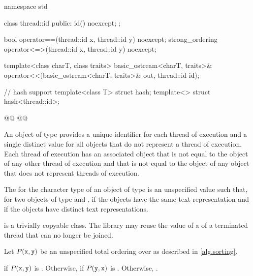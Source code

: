 \documentclass{wg21}
\begin{document}
%
%
\begin{codeblock}
    namespace std {
        class thread::id {
            public:
            id() noexcept;
        };

        bool operator==(thread::id x, thread::id y) noexcept;
        strong_ordering operator<=>(thread::id x, thread::id y) noexcept;

        template<class charT, class traits>
        basic_ostream<charT, traits>&
        operator<<(basic_ostream<charT, traits>& out, thread::id id);

        // hash support
        template<class T> struct hash;
        template<> struct hash<thread::id>;

        @@
        @@
    }
\end{codeblock}

\pnum
An object of type  provides a unique identifier for
each thread of execution and a single distinct value for all 
objects that do not represent a thread of
execution. Each thread of execution has an
associated  object that is not equal to the
 object of any other thread of execution and that is not
equal to the  object of any  object that
does not represent threads of execution.

\begin{addedblock}
The  for the character type  of an object of type 
is an unspecified value such that, for two objects of type   and ,
if  the  objects have the same text
representation and if  the  objects have
distinct text representations.
\end{addedblock}

\pnum
{} is a trivially copyable class.
The library may reuse the value of a  of a terminated thread that can no longer be joined.


\begin{itemdescr}
    \pnum
    Let $P(\texttt{x}, \texttt{y})$ be
    an unspecified total ordering over 
    as described in \ref{alg.sorting}.

    \pnum
    \returns
     if $P(\texttt{x}, \texttt{y})$ is .
    Otherwise, 
    if $P(\texttt{y}, \texttt{x})$ is .
    Otherwise, .
\end{itemdescr}
\end{document}

